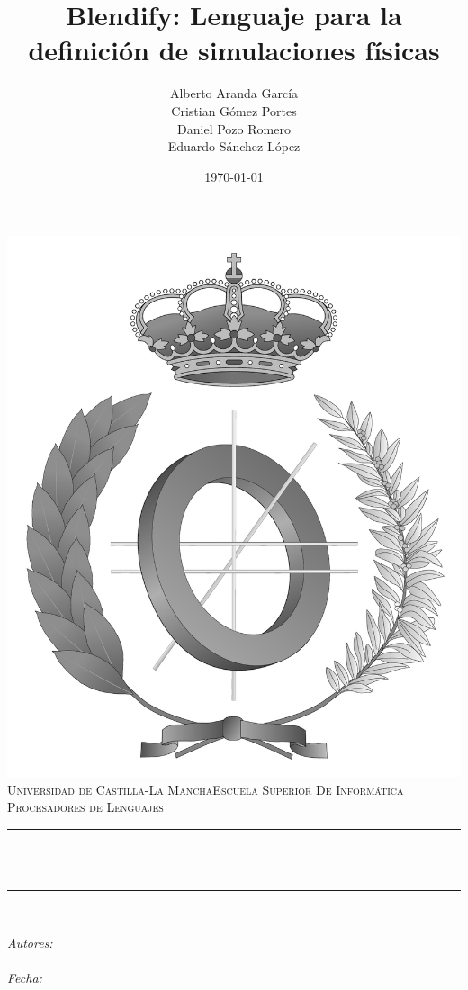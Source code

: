 \documentclass[12pt]{article}
\title{Blendify: Lenguaje para la definición de simulaciones físicas}												%
\author{Alberto Aranda García \\ Cristian Gómez Portes \\ Daniel Pozo Romero \\ Eduardo Sánchez López}				%
\date{\today}																										%
\makeatletter
\let\thetitle\@title
\let\theauthor\@author
\let\thedate\@date
\makeatother
\begin{document}

\begin{titlepage}
	\centering
    \vspace*{0.5 cm}
    \includegraphics[scale = 0.15]{informatica_gray.pdf}\\[1.5 cm]														%
    \textsc{\LARGE Universidad de Castilla-La Mancha\newline\newline Escuela Superior De Informática}\\[2.0 cm]		%
	\textsc{\Large Procesadores de Lenguajes}\\[0.5 cm]																	%
	\rule{\linewidth}{0.2 mm} \\[0.4 cm]
	{ \huge \bfseries \thetitle}\\
	\rule{\linewidth}{0.2 mm} \\[1.5 cm]
	
	\begin{minipage}{0.4\textwidth}
		\begin{center} \large
			\emph{Autores:}\\
			\theauthor\\
			\vspace*{1 cm}
			\emph{Fecha:}\\
			\thedate\\
			\end{center}
        
	\end{minipage}\\[2 cm]
	
\end{titlepage}
\end{document}
